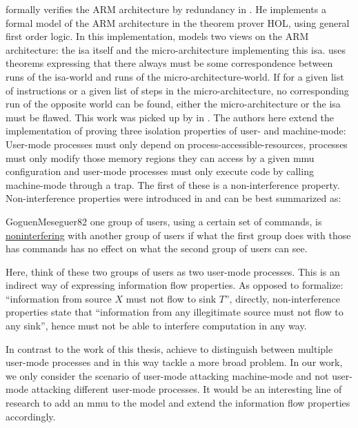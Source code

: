 \citeauthor{Fox02} formally verifies the ARM architecture by redundancy in  \cite{Fox02}.
He implements a formal model of the ARM architecture in the theorem prover HOL, using general first order logic.
In this implementation, \citeauthor{Fox02} models two views on the ARM architecture: the \gls{isa} itself and the micro-architecture implementing this \gls{isa}.
\citeauthor{Fox02} uses theorems expressing that there always must be some correspondence between runs of the \gls{isa}-world and runs of the micro-architecture-world.
If for a given list of instructions or a given list of steps in the micro-architecture, no corresponding run of the opposite world can be found, either the micro-architecture or the \gls{isa} must be flawed.
This work was picked up by \citeauthor{KhakpourSD13} in  \cite{KhakpourSD13}.
The authors here extend the implementation of \citeauthor{Fox02} proving three isolation properties of user- and machine-mode:
User-mode processes must only depend on process-accessible-resources, processes must only modify those memory regions they can access by a given \gls{mmu} configuration and user-mode processes must only execute code by calling machine-mode through a trap.
The first of these is a non-interference property.
Non-interference properties were introduced in \cite{GoguenMeseguer82} and can be best summarized as:
\begin{displaycquote}[p.11]{GoguenMeseguer82}
    one group of users, using a certain set of commands, is \underline{noninterfering} with another group of users if what the first group does with those has commands has no effect on what the second group of users can see.
\end{displaycquote}
Here, think of these two groups of users as two user-mode processes.
This is an indirect way of expressing information flow properties.
As opposed to formalize: \enquote{information from source $ X $ must not flow to sink $ T $}, directly, non-interference properties state that \enquote{information from any illegitimate source must not flow to any sink}, hence must not be able to interfere computation in any way.

In contrast to the work of this thesis, \citeauthor{KhakpourSD13} achieve to distinguish between multiple user-mode processes and in this way tackle a more broad problem.
In our work, we only consider the scenario of user-mode attacking machine-mode and not user-mode attacking different user-mode processes.
It would be an interesting line of research to add an \gls{mmu} to the model and extend the information flow properties accordingly.

